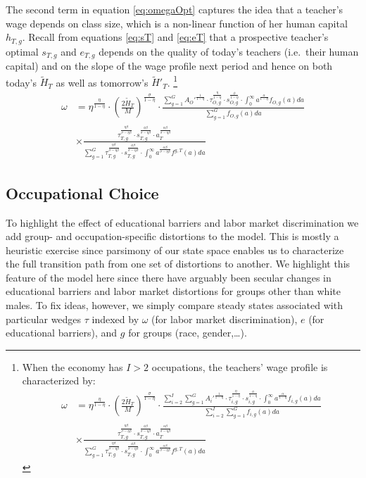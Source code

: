 \documentclass[onehalfspacing,11pt]{article}
\begin{document}
		The second term in equation \eqref{eq:omegaOpt} captures the idea that a teacher's wage depends on class size, which is a non-linear function of her human capital $h_{T,g}$. Recall from equations \eqref{eq:sT} and \eqref{eq:eT} that a prospective teacher's optimal $s_{T,g}$ and $e_{T,g}$ depends on the quality of today's teachers (i.e.~their human capital) and on the slope of the wage profile next period and hence on both today's $ \widetilde{H}_{T}$ as well as tomorrow's $\widetilde{H}'_{T}$. \footnote{When the economy has $I>2$ occupations, the teachers' wage profile is characterized by:
			\begin{align*}
				\omega & = \eta^{\frac{\eta}{1-\eta}}\cdot \left(\tfrac{2\widetilde{H}_T}{M}\right)^{\frac{\sigma}{1-\eta}} \cdot \frac{\sum_{i=2}^I\sum_{g=1}^G {A_i'}^\frac{1}{1-\eta}\cdot\tau_{i,g}^\frac{\eta}{1-\eta} \cdot s_{i,g}^\frac{\phi}{1-\eta}\cdot \int_0^\infty a^{\frac{\alpha}{1-\eta}} f_{i,g}(a)da}{\sum_{i=2}^I\sum_{g=1}^G f_{i,g}(a)da} \nonumber\\
				& \times \frac{\tau_{T,g}^\frac{\eta\beta}{\sigma-\eta\beta } \cdot s_{T,g}^\frac{\phi\beta }{\sigma-\eta\beta } \cdot a_T^\frac{\alpha\beta }{\sigma-\eta\beta}}{\sum_{g=1}^G \tau_{T,g}^\frac{\eta\beta }{\sigma-\eta\beta } \cdot s_{T,g}^\frac{\phi\beta }{\sigma-\eta\beta } \cdot \int_0^\infty a^\frac{\alpha\beta}{\sigma-\eta\beta } f^{g,T}(a)da}
			\end{align*}
		}
		\begin{align}
			\omega & = \eta^{\frac{\eta}{1-\eta}}\cdot \left(\tfrac{2\widetilde{H}_T}{M}\right)^{\frac{\sigma}{1-\eta}} \cdot \frac{\sum_{g=1}^G {A_O'}^\frac{1}{1-\eta}\cdot\tau_{O,g}^\frac{\eta}{1-\eta} \cdot s_{O,g}^\frac{\phi}{1-\eta}\cdot \int_0^\infty a^{\frac{\alpha}{1-\eta}} f_{O,g}(a)da}{\sum_{g=1}^G f_{O,g}(a)da} \nonumber\\
			& \times \frac{\tau_{T,g}^\frac{\eta\beta}{\sigma-\eta\beta } \cdot s_{T,g}^\frac{\phi\beta }{\sigma-\eta\beta } \cdot a_T^\frac{\alpha\beta }{\sigma-\eta\beta}}{\sum_{g=1}^G \tau_{T,g}^\frac{\eta\beta }{\sigma-\eta\beta } \cdot s_{T,g}^\frac{\phi\beta }{\sigma-\eta\beta } \cdot \int_0^\infty a^\frac{\alpha\beta}{\sigma-\eta\beta } f^{g,T}(a)da}
		\end{align}
		
		\subsection{Occupational Choice}%
	To highlight the effect of educational barriers and labor market discrimination we add group- and occupation-specific distortions to the model. This is mostly a heuristic exercise since parsimony of our state space enables us to characterize the full transition path from one set of distortions to another. We highlight this feature of the model here since there have arguably been secular changes in educational barriers and labor market distortions for groups other than white males. To fix ideas, however, we simply compare steady states associated with particular wedges $\tau$ indexed by $\omega$ (for labor market discrimination), $e$ (for educational barriers), and $g$ for groups (race, gender,\ldots).
	
\end{document}
